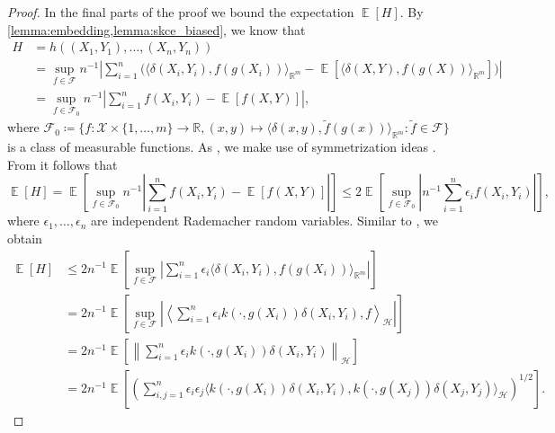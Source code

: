 \documentclass{article}
\DeclareMathOperator{\Expect}{\mathbb{E}}
\begin{document}
\begin{proof}
  In the final parts of the proof we bound the expectation $\Expect[H]$. By
  \cref{lemma:embedding,lemma:skce_biased}, we know that
  \begin{equation*}
    \begin{split}
      H &= h((X_1,Y_1),\ldots,(X_n,Y_n)) \\
      &= \sup_{f \in \mathcal{F}} n^{-1} \left| \sum_{i=1}^n \Big(\langle \delta(X_i,Y_i), f(g(X_i)) \rangle_{\mathbb{R}^m} - \Expect\left[\langle \delta(X, Y), f(g(X)) \rangle_{\mathbb{R}^m} \right]\Big) \right| \\
      &= \sup_{f \in \mathcal{F}_0} n^{-1} \left| \sum_{i=1}^n f(X_i,Y_i) - \Expect[f(X,Y)] \right|,
    \end{split}
  \end{equation*}
  where $\mathcal{F}_0 \coloneqq \{ f \colon \mathcal{X} \times \{1,\ldots,m\} \to \mathbb{R}, (x,y) \mapsto \langle \delta(x,y), \tilde{f}(g(x)) \rangle_{\mathbb{R}^m} \colon \tilde{f} \in \mathcal{F} \}$
  is a class of measurable functions. As \citet{gretton12_kernel_two_sampl_test},
  we make use of symmetrization ideas
  \citep[p.~108]{vaart96_weak_conver_empir_proces}. From
  \citet[Lemma~2.3.1]{vaart96_weak_conver_empir_proces} it follows that
  \begin{equation*}
    \Expect[H] =\Expect\left[\sup_{f \in \mathcal{F}_0} n^{-1} \left| \sum_{i=1}^n f(X_i,Y_i) - \Expect[f(X,Y)] \right|\right] \leq 2 \Expect\left[\sup_{f \in \mathcal{F}_0} \left|n^{-1} \sum_{i=1}^n \epsilon_i f(X_i,Y_i) \right|\right],
  \end{equation*}
  where $\epsilon_1,\ldots,\epsilon_n$ are independent Rademacher random
  variables. Similar to \citet[Lemma~22]{bartlett02_radem_gauss_compl}, we
  obtain
  \begin{equation*}
    \begin{split}
      \Expect[H] &\leq 2n^{-1} \Expect\left[\sup_{f \in \mathcal{F}} \left| \sum_{i=1}^n \epsilon_i \langle \delta(X_i, Y_i), f(g(X_i))\rangle_{\mathbb{R}^m} \right|\right] \\
      &= 2n^{-1} \Expect\left[\sup_{f \in \mathcal{F}} \left| \left\langle \sum_{i=1}^n \epsilon_i k(\cdot, g(X_i)) \delta(X_i, Y_i), f \right\rangle_{\mathcal{H}} \right|\right] \\
      &= 2n^{-1} \Expect\left[ \left\|\sum_{i=1}^n \epsilon_i k(\cdot, g(X_i)) \delta(X_i, Y_i) \right\|_{\mathcal{H}} \right] \\
      &= 2n^{-1}\Expect\left[ {\left( \sum_{i,j=1}^n \epsilon_i \epsilon_j \langle k(\cdot, g(X_i)) \delta(X_i, Y_i), k(\cdot, g(X_j)) \delta(X_j, Y_j) \rangle_{\mathcal{H}}\right)}^{1/2} \right].

\end{split}
\end{equation*}
\end{proof}
\end{document}
